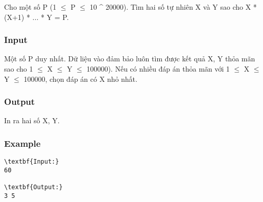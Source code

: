 



   Cho một số P (1  $\le$  P  $\le$  10 ^ 20000). Tìm hai số tự nhiên X và Y sao cho X * (X+1) * ... * Y = P.  

\subsubsection{   Input  }

   Một số P duy nhất. Dữ liệu vào đảm bảo luôn tìm được kết quả X, Y thỏa mãn sao cho 1  $\le$  X  $\le$  Y  $\le$  100000). Nếu có nhiều đáp án thỏa mãn với 1  $\le$  X  $\le$  Y  $\le$  100000, chọn đáp án có X nhỏ nhất.  

\subsubsection{   Output  }

   In ra hai số X, Y.  

\subsubsection{   Example  }
\begin{verbatim}
\textbf{Input:}
60

\textbf{Output:}
3 5
\end{verbatim}
